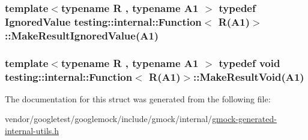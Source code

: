 \subsubsection[{\texorpdfstring{Make\+Result\+Ignored\+Value}{MakeResultIgnoredValue}}]{\setlength{\rightskip}{0pt plus 5cm}template$<$typename R , typename A1 $>$ typedef {\bf Ignored\+Value} {\bf testing\+::internal\+::\+Function}$<$ R(A1)$>$\+::Make\+Result\+Ignored\+Value(A1)}\hypertarget{structtesting_1_1internal_1_1Function_3_01R_07A1_08_4_a8fa56b9e05cb029ec7c8415ee352f865}{}\label{structtesting_1_1internal_1_1Function_3_01R_07A1_08_4_a8fa56b9e05cb029ec7c8415ee352f865}
\subsubsection[{\texorpdfstring{Make\+Result\+Void}{MakeResultVoid}}]{\setlength{\rightskip}{0pt plus 5cm}template$<$typename R , typename A1 $>$ typedef void {\bf testing\+::internal\+::\+Function}$<$ R(A1)$>$\+::Make\+Result\+Void(A1)}\hypertarget{structtesting_1_1internal_1_1Function_3_01R_07A1_08_4_aab10495172953eb51fc3940c4c1e890a}{}\label{structtesting_1_1internal_1_1Function_3_01R_07A1_08_4_aab10495172953eb51fc3940c4c1e890a}


The documentation for this struct was generated from the following file\+:\begin{DoxyCompactItemize}
\item 
vendor/googletest/googlemock/include/gmock/internal/\hyperlink{gmock-generated-internal-utils_8h}{gmock-\/generated-\/internal-\/utils.\+h}\end{DoxyCompactItemize}
